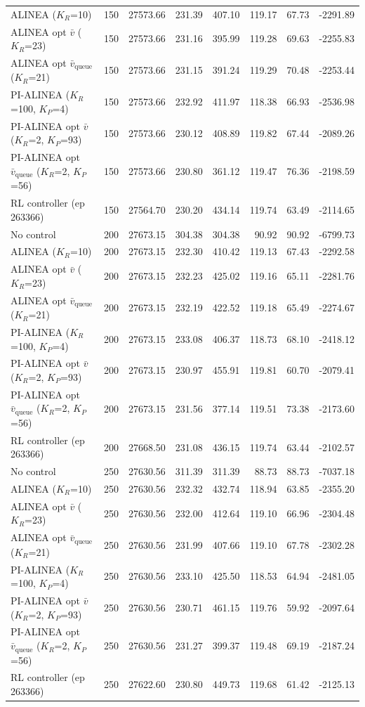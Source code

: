 \begin{longtable}{p{5.2cm}rrrrrrr}
ALINEA ($K_R$=10) & 150 & 27573.66 & 231.39 & 407.10 & 119.17 & 67.73 & -2291.89 \\
ALINEA opt $\bar{v}$ ($K_R$=23) & 150 & 27573.66 & 231.16 & 395.99 & 119.28 & 69.63 & -2255.83 \\
ALINEA opt $\bar{v}_{\mathrm{queue}}$ ($K_R$=21) & 150 & 27573.66 & 231.15 & 391.24 & 119.29 & 70.48 & -2253.44 \\
PI-ALINEA ($K_R$=100, $K_P$=4) & 150 & 27573.66 & 232.92 & 411.97 & 118.38 & 66.93 & -2536.98 \\
PI-ALINEA opt $\bar{v}$ ($K_R$=2, $K_P$=93) & 150 & 27573.66 & 230.12 & 408.89 & 119.82 & 67.44 & -2089.26 \\
PI-ALINEA opt $\bar{v}_{\mathrm{queue}}$ ($K_R$=2, $K_P$=56) & 150 & 27573.66 & 230.80 & 361.12 & 119.47 & 76.36 & -2198.59 \\
RL controller (ep 263366) & 150 & 27564.70 & 230.20 & 434.14 & 119.74 & 63.49 & -2114.65 \\
\midrule
No control & 200 & 27673.15 & 304.38 & 304.38 & 90.92 & 90.92 & -6799.73 \\
ALINEA ($K_R$=10) & 200 & 27673.15 & 232.30 & 410.42 & 119.13 & 67.43 & -2292.58 \\
ALINEA opt $\bar{v}$ ($K_R$=23) & 200 & 27673.15 & 232.23 & 425.02 & 119.16 & 65.11 & -2281.76 \\
ALINEA opt $\bar{v}_{\mathrm{queue}}$ ($K_R$=21) & 200 & 27673.15 & 232.19 & 422.52 & 119.18 & 65.49 & -2274.67 \\
PI-ALINEA ($K_R$=100, $K_P$=4) & 200 & 27673.15 & 233.08 & 406.37 & 118.73 & 68.10 & -2418.12 \\
PI-ALINEA opt $\bar{v}$ ($K_R$=2, $K_P$=93) & 200 & 27673.15 & 230.97 & 455.91 & 119.81 & 60.70 & -2079.41 \\
PI-ALINEA opt $\bar{v}_{\mathrm{queue}}$ ($K_R$=2, $K_P$=56) & 200 & 27673.15 & 231.56 & 377.14 & 119.51 & 73.38 & -2173.60 \\
RL controller (ep 263366) & 200 & 27668.50 & 231.08 & 436.15 & 119.74 & 63.44 & -2102.57 \\
\midrule
No control & 250 & 27630.56 & 311.39 & 311.39 & 88.73 & 88.73 & -7037.18 \\
ALINEA ($K_R$=10) & 250 & 27630.56 & 232.32 & 432.74 & 118.94 & 63.85 & -2355.20 \\
ALINEA opt $\bar{v}$ ($K_R$=23) & 250 & 27630.56 & 232.00 & 412.64 & 119.10 & 66.96 & -2304.48 \\
ALINEA opt $\bar{v}_{\mathrm{queue}}$ ($K_R$=21) & 250 & 27630.56 & 231.99 & 407.66 & 119.10 & 67.78 & -2302.28 \\
PI-ALINEA ($K_R$=100, $K_P$=4) & 250 & 27630.56 & 233.10 & 425.50 & 118.53 & 64.94 & -2481.05 \\
PI-ALINEA opt $\bar{v}$ ($K_R$=2, $K_P$=93) & 250 & 27630.56 & 230.71 & 461.15 & 119.76 & 59.92 & -2097.64 \\
PI-ALINEA opt $\bar{v}_{\mathrm{queue}}$ ($K_R$=2, $K_P$=56) & 250 & 27630.56 & 231.27 & 399.37 & 119.48 & 69.19 & -2187.24 \\
RL controller (ep 263366) & 250 & 27622.60 & 230.80 & 449.73 & 119.68 & 61.42 & -2125.13 \\
\end{longtable}
\endgroup